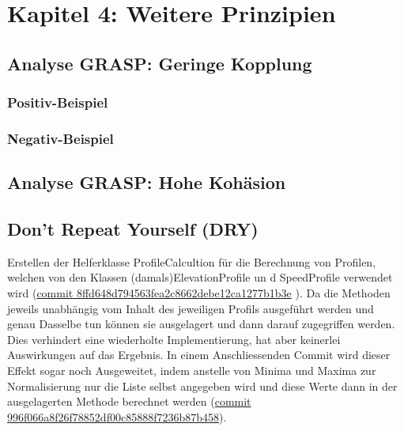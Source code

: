 \section{Kapitel 4: Weitere Prinzipien}

\subsection{Analyse GRASP: Geringe Kopplung}


\subsubsection{Positiv-Beispiel}


\subsubsection{Negativ-Beispiel}


\subsection{Analyse GRASP: Hohe Kohäsion}



\subsection{Don’t Repeat Yourself (DRY)}

Erstellen der Helferklasse ProfileCalcultion für die Berechnung von Profilen, welchen von den Klassen (damals)ElevationProfile un d SpeedProfile verwendet wird (\href{https://github.com/reichert-p/GPXrechner/commit/8ffd648d794563fea2c8662debe12ca1277b1b3e#diff-3be7b5bf425b2c9794272cdc879a4e9b0ed23bab55acbdf71756fbda1356ff80}{commit 8ffd648d794563fea2c8662debe12ca1277b1b3e} ).
Da die Methoden jeweils unabhängig vom Inhalt des jeweiligen Profils ausgeführt werden und genau Dasselbe tun können sie ausgelagert und dann darauf zugegriffen werden. Dies verhindert eine wiederholte Implementierung, hat aber keinerlei Auswirkungen auf das Ergebnis. In einem Anschliessenden Commit wird dieser Effekt sogar noch Ausgeweitet, indem anstelle von Minima und Maxima zur Normalisierung nur die Liste selbst angegeben wird und diese Werte dann in der ausgelagerten Methode berechnet werden (\href{https://github.com/reichert-p/GPXrechner/commit/996f066a8f26f78852df00c85888f7236b87b458#diff-3be7b5bf425b2c9794272cdc879a4e9b0ed23bab55acbdf71756fbda1356ff80}{commit 996f066a8f26f78852df00c85888f7236b87b458}).

